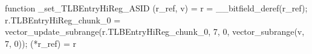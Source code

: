 function _set_TLBEntryHiReg_ASID (r_ref, v) = {
    r = __bitfield_deref(r_ref);
    r.TLBEntryHiReg_chunk_0 = vector_update_subrange(r.TLBEntryHiReg_chunk_0, 7, 0, vector_subrange(v, 7, 0));
    (*r_ref) = r
}
